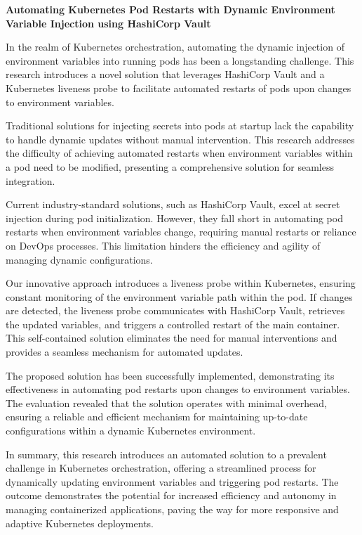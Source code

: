 \textbf{Automating Kubernetes Pod Restarts with Dynamic Environment Variable Injection using HashiCorp Vault}

\medskip

In the realm of Kubernetes orchestration, automating the dynamic injection of environment variables into running pods has been a longstanding challenge. This research introduces a novel solution that leverages HashiCorp Vault and a Kubernetes liveness probe to facilitate automated restarts of pods upon changes to environment variables.

Traditional solutions for injecting secrets into pods at startup lack the capability to handle dynamic updates without manual intervention. This research addresses the difficulty of achieving automated restarts when environment variables within a pod need to be modified, presenting a comprehensive solution for seamless integration.

Current industry-standard solutions, such as HashiCorp Vault, excel at secret injection during pod initialization. However, they fall short in automating pod restarts when environment variables change, requiring manual restarts or reliance on DevOps processes. This limitation hinders the efficiency and agility of managing dynamic configurations.

Our innovative approach introduces a liveness probe within Kubernetes, ensuring constant monitoring of the environment variable path within the pod. If changes are detected, the liveness probe communicates with HashiCorp Vault, retrieves the updated variables, and triggers a controlled restart of the main container. This self-contained solution eliminates the need for manual interventions and provides a seamless mechanism for automated updates.

The proposed solution has been successfully implemented, demonstrating its effectiveness in automating pod restarts upon changes to environment variables. The evaluation revealed that the solution operates with minimal overhead, ensuring a reliable and efficient mechanism for maintaining up-to-date configurations within a dynamic Kubernetes environment.

In summary, this research introduces an automated solution to a prevalent challenge in Kubernetes orchestration, offering a streamlined process for dynamically updating environment variables and triggering pod restarts. The outcome demonstrates the potential for increased efficiency and autonomy in managing containerized applications, paving the way for more responsive and adaptive Kubernetes deployments.




